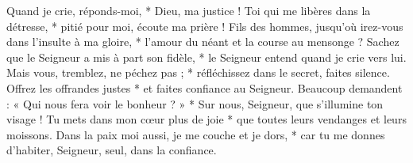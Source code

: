 Quand je crie, réponds-moi, *
Dieu, ma justice !
\versseparator
Toi qui me libères dans la détresse, *
pitié pour moi, écoute ma prière !
\versseparator
Fils des hommes,
jusqu'où irez-vous dans l'insulte à ma gloire, *
l'amour du néant et la course au mensonge ?
\versseparator
Sachez que le Seigneur a mis à part son fidèle, *
le Seigneur entend quand je crie vers lui.
\versseparator
Mais vous, tremblez, ne péchez pas ; *
réfléchissez dans le secret, faites silence.
\versseparator
Offrez les offrandes justes *
et faites confiance au Seigneur.
\versseparator
Beaucoup demandent :
« Qui nous fera voir le bonheur ? » *
Sur nous, Seigneur, que s'illumine ton visage !
\versseparator
Tu mets dans mon cœur plus de joie *
que toutes leurs vendanges et leurs moissons.
\versseparator
Dans la paix moi aussi, je me couche et je dors, *
car tu me donnes d'habiter, Seigneur,
seul, dans la confiance.
